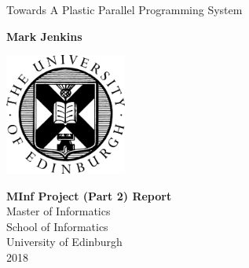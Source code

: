 \documentclass{report}
\begin{document}
\begin{titlepage}
    \begin{center}
        \vspace*{3cm}
        
        \Huge
        Towards A Plastic Parallel Programming System
        
        \vspace{1.5cm}
        
        \large
        \textbf{Mark Jenkins}
        
        \vspace{2.5cm}

        \includegraphics[width=0.3\textwidth]{university}

        \vspace{2.5cm}
        
        \textbf{MInf Project (Part 2) Report}\\
        Master of Informatics\\
        School of Informatics\\
        University of Edinburgh\\
        2018
    \end{center}
\end{titlepage}

\setlength\parskip{1em}
\setlength\parindent{0pt}
\end{document}
